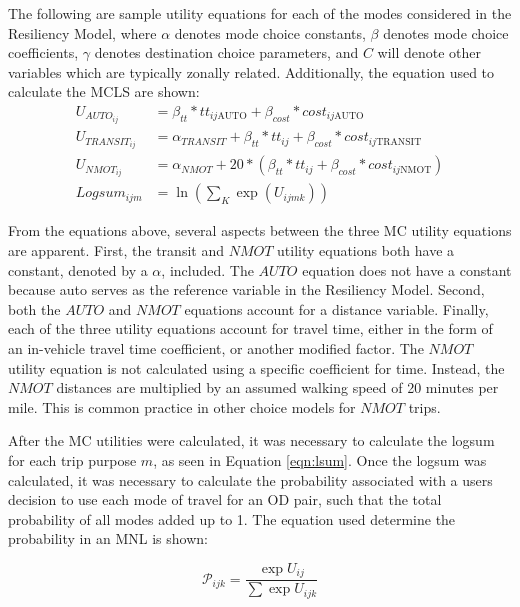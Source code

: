 The following are sample utility equations for each of the modes considered in
the Resiliency Model, where $\alpha$ denotes mode choice constants, $\beta$ denotes
mode choice coefficients, $\gamma$ denotes destination choice parameters, and
$C$ will denote other variables which are typically zonally related. Additionally,
the equation used to calculate the MCLS are shown:
\begin{align}
U_{{AUTO}_{ij}} &= \beta_{tt} * tt_{ij\mathrm{AUTO}} + \beta_{cost}* cost_{ij\mathrm{AUTO}} \\
U_{{TRANSIT}_{ij}} &= \alpha_{TRANSIT} + \beta_{tt} * tt_{ij} + \beta_{cost} * cost_{ij\mathrm{TRANSIT}} \\
U_{{NMOT}_{ij}} &= \alpha_{NMOT} + 20 * (\beta_{tt{}} * tt_{ij} + \beta_{cost} * cost_{ij\mathrm{NMOT}}) \\
Logsum_{ijm} &= \ln(\sum_K \exp (U_{ijmk})) \label{eqn:lsum}
\end{align}

From the equations above, several aspects between the three MC utility equations are
apparent. First, the transit and $NMOT$ utility equations both have a constant, denoted by a $\alpha$,
included. The $AUTO$ equation does not have a constant because auto serves as the reference
variable in the Resiliency Model. Second, both the $AUTO$ and $NMOT$ equations account for a
distance variable. Finally, each of the three utility equations account for travel time, either in the
form of an in-vehicle travel time coefficient, or another modified factor. The $NMOT$ utility
equation is not calculated using a specific coefficient for time. Instead, the $NMOT$ distances are
multiplied by an assumed walking speed of 20 minutes per mile. This is common practice in other
choice models for $NMOT$ trips.

After the MC utilities were calculated, it was necessary to calculate the logsum for
each trip purpose \(m\), as seen in Equation \ref{eqn:lsum}. Once the logsum was calculated,
it was necessary to calculate the probability associated with a users decision to use
each mode of travel for an OD pair, such that the total probability of all modes added
up to 1. The equation used determine the probability in an MNL is shown:

\begin{equation}
	\mathcal{P}_{ijk} = \frac{\exp U_{ij}}{\sum \exp U_{ijk}}
	\label{eqn:prob}
\end{equation}

